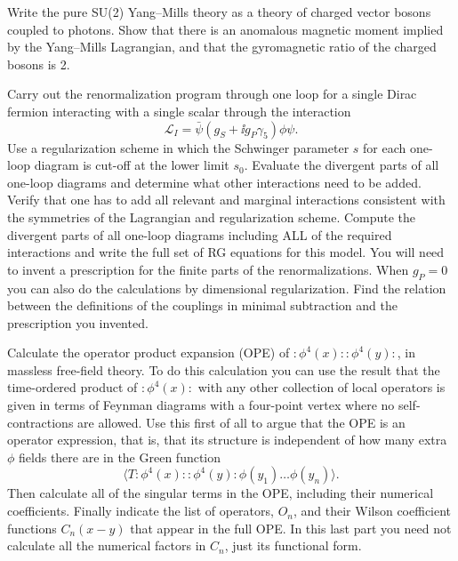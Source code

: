 \begin{banksproblems}

Write the pure SU(2) Yang--Mills theory as a theory of charged vector bosons
coupled to photons. Show that there is an anomalous magnetic moment implied by
the Yang--Mills Lagrangian, and that the gyromagnetic ratio of the charged
bosons is 2.

Carry out the renormalization program through one loop for a single Dirac
fermion interacting with a single scalar through the interaction
\[
  \mathcal{L}_I=\bar\psi(g_S+\ii g_P\gamma_5)\phi\psi.
\]
Use a regularization scheme in which the Schwinger parameter $s$ for each
one-loop diagram is cut-off at the lower limit $s_0$. Evaluate the divergent
parts of all one-loop diagrams and determine what other interactions need to be
added. Verify that one has to add all relevant and marginal interactions
consistent with the symmetries of the Lagrangian and regularization scheme.
Compute the divergent parts of all one-loop diagrams including ALL of the
required interactions and write the full set of RG equations for this model.
You will need to invent a prescription for the finite parts of the
renormalizations. When $g_P=0$ you can also do the calculations by dimensional
regularization. Find the relation between the definitions of the couplings in
minimal subtraction and the prescription you invented.

Calculate the operator product expansion (OPE) of
$:\!\phi^4(x)\!::\!\phi^4(y)\!:$, in massless free-field theory. To do this
calculation you can use the result that the time-ordered product of
$:\!\phi^4(x)\!:$ with any other collection of local operators is given in
terms of Feynman diagrams with a four-point vertex where no self-contractions
are allowed. Use this first of all to argue that the OPE is an operator
expression, that is, that its structure is independent of how many extra
$\phi$ fields there are in the Green function
\[
  \langle T:\!\phi^4(x)\!::\!\phi^4(y)\!:\phi(y_1)\ldots\phi(y_n)\rangle.
\]
Then calculate all of the singular terms in the OPE, including their numerical
coefficients. Finally indicate the list of operators, $O_n$, and their Wilson
coefficient functions $C_n(x-y)$ that appear in the full OPE. In this last
part you need not calculate all the numerical factors in $C_n$, just its
functional form.


\end{banksproblems}
